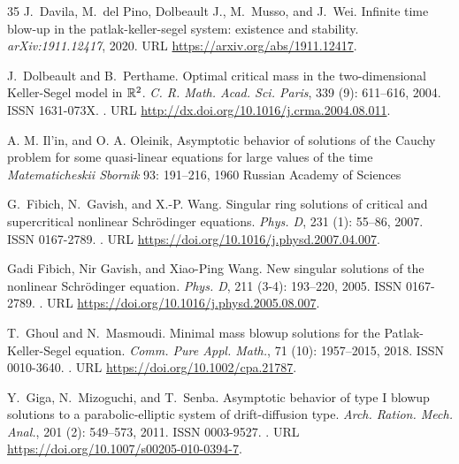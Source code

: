 \documentclass[11pt]{aims}
\theoremstyle{definition}
\numberwithin{equation}{section}
\begin{document}
\begin{thebibliography}{35}
J.~Davila, M.~del Pino, Dolbeault J., M.~Musso, and J.~Wei.
\newblock Infinite time blow-up in the patlak-keller-segel system: existence
  and stability.
\newblock \emph{arXiv:1911.12417}, 2020.
\newblock URL \url{https://arxiv.org/abs/1911.12417}.



J.~Dolbeault and B.~Perthame.
\newblock Optimal critical mass in the two-dimensional {K}eller-{S}egel model
  in {$\Bbb R^2$}.
\newblock \emph{C. R. Math. Acad. Sci. Paris}, 339 (9):
  611--616, 2004.
\newblock ISSN 1631-073X.
\newblock {}.
\newblock URL \url{http://dx.doi.org/10.1016/j.crma.2004.08.011}.

A. M. Il'in, and O. A. Oleinik,
\newblock Asymptotic behavior of solutions of the Cauchy problem for some quasi-linear equations for large values of the time
\newblock \emph{Matematicheskii Sbornik} 93: 191--216, 1960
\newblock Russian Academy of Sciences


G.~Fibich, N.~Gavish, and X.-P. Wang.
\newblock Singular ring solutions of critical and supercritical nonlinear
  {S}chr\"{o}dinger equations.
\newblock \emph{Phys. D}, 231 (1): 55--86, 2007.
\newblock ISSN 0167-2789.
\newblock {}.
\newblock URL \url{https://doi.org/10.1016/j.physd.2007.04.007}.

Gadi Fibich, Nir Gavish, and Xiao-Ping Wang.
\newblock New singular solutions of the nonlinear {S}chr\"{o}dinger equation.
\newblock \emph{Phys. D}, 211 (3-4): 193--220, 2005.
\newblock ISSN 0167-2789.
\newblock {}.
\newblock URL \url{https://doi.org/10.1016/j.physd.2005.08.007}.

T.~Ghoul and N.~Masmoudi.
\newblock Minimal mass blowup solutions for the {P}atlak-{K}eller-{S}egel
  equation.
\newblock \emph{Comm. Pure Appl. Math.}, 71 (10): 1957--2015,
  2018.
\newblock ISSN 0010-3640.
\newblock {}.
\newblock URL \url{https://doi.org/10.1002/cpa.21787}.

Y.~Giga, N.~Mizoguchi, and T.~Senba.
\newblock Asymptotic behavior of type {I} blowup solutions to a
  parabolic-elliptic system of drift-diffusion type.
\newblock \emph{Arch. Ration. Mech. Anal.}, 201 (2):
  549--573, 2011.
\newblock ISSN 0003-9527.
\newblock {}.
\newblock URL \url{https://doi.org/10.1007/s00205-010-0394-7}.


\end{thebibliography}
\end{document}
